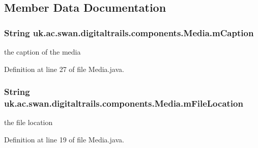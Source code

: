 \subsection{Member Data Documentation}
\hypertarget{classuk_1_1ac_1_1swan_1_1digitaltrails_1_1components_1_1_media_a06f8429d27ef6eb5d90b60d38abb9e7e}{
\subsubsection[{m\+Caption}]{\setlength{\rightskip}{0pt plus 5cm}String uk.\+ac.\+swan.\+digitaltrails.\+components.\+Media.\+m\+Caption\hspace{0.3cm}{\ttfamily [protected]}}}\label{classuk_1_1ac_1_1swan_1_1digitaltrails_1_1components_1_1_media_a06f8429d27ef6eb5d90b60d38abb9e7e}


the caption of the media 



Definition at line 27 of file Media.\+java.

\hypertarget{classuk_1_1ac_1_1swan_1_1digitaltrails_1_1components_1_1_media_adca9e1c69acc1e40cbc0903bb647dbf7}{
\subsubsection[{m\+File\+Location}]{\setlength{\rightskip}{0pt plus 5cm}String uk.\+ac.\+swan.\+digitaltrails.\+components.\+Media.\+m\+File\+Location\hspace{0.3cm}{\ttfamily [protected]}}}\label{classuk_1_1ac_1_1swan_1_1digitaltrails_1_1components_1_1_media_adca9e1c69acc1e40cbc0903bb647dbf7}


the file location 



Definition at line 19 of file Media.\+java.

